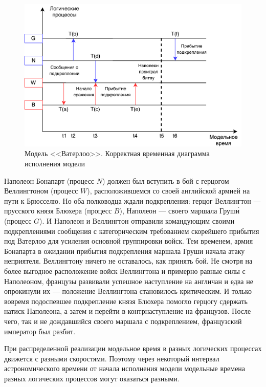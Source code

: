 \begin{figure}[!ht]
\centering
\includegraphics[scale=1]{images/waterloo.pdf}
\caption{Модель <<Ватерлоо>>. Корректная временная диаграмма исполнения модели}
\label{fig:Корректная временная диаграмма исполнения модели}
\end{figure}

Наполеон Бонапарт (процесс $N$) должен был вступить в бой с герцогом Веллингтоном (процесс $W$), расположившемся со своей английской армией на пути к Брюсселю. Но оба полководца ждали подкрепления: герцог Веллингтон --- прусского князя Блюхера (процесс $B$), Наполеон --- своего маршала Груш\'и (процесс $G$). И Наполеон и Веллингтон отправили командующим своими подкреплениями сообщения с категорическим требованием скорейшего прибытия под Ватерлоо для усиления основной группировки войск. Тем временем, армия Бонапарта в ожидании прибытия подкрепления маршала Груши начала атаку неприятеля. Веллингтону ничего не оставалось, как принять бой. Не смотря на более выгодное расположение войск Веллингтона и примерно равные силы с Наполеоном, французы развивали успешное наступление на англичан и едва не опрокинули их --- положение Веллингтона становилось критическим. И только вовремя подоспевшее подкрепление князя Блюхера помогло герцогу сдержать натиск Наполеона, а затем и перейти в контрнаступление на французов. После чего, так и не дождавшийся своего маршала с подкреплением, французский император был разбит.

При распределенной реализации модельное время в разных логических процессах движется с разными скоростями.  Поэтому через некоторый интервал астрономического времени от начала исполнения модели модельные времена разных логических процессов могут оказаться разными.

